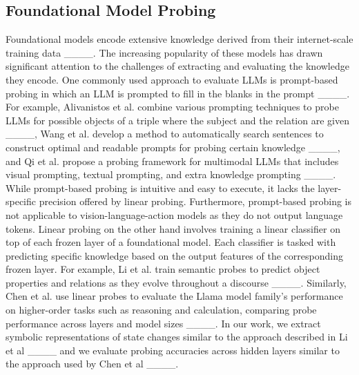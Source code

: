\subsection{Foundational Model Probing}
Foundational models encode extensive knowledge derived from their internet-scale training data ____. The increasing popularity of these models has drawn significant attention to the challenges of extracting and evaluating the knowledge they encode. One commonly used approach to evaluate LLMs is prompt-based probing in which an LLM is prompted to fill in the blanks in the prompt ____. For example, Alivanistos et al. combine various prompting techniques to probe LLMs for possible objects of a triple where the subject and the relation are given ____, Wang et al. develop a method to automatically search sentences to construct optimal and readable prompts for probing certain knowledge ____, and Qi et al. propose a probing framework for multimodal LLMs that includes visual prompting, textual prompting, and extra knowledge prompting ____. While prompt-based probing is intuitive and easy to execute, it lacks the layer-specific precision offered by linear probing. Furthermore, prompt-based probing is not applicable to vision-language-action models as they do not output language tokens. Linear probing on the other hand involves training a linear classifier on top of each frozen layer of a foundational model. Each classifier is tasked with predicting specific knowledge based on the output features of the corresponding frozen layer. For example, Li et al. train semantic probes to predict object properties and relations as they evolve throughout a discourse ____. Similarly, Chen et al. use linear probes to evaluate the Llama model family’s performance on higher-order tasks such as reasoning and calculation, comparing probe performance across layers and model sizes ____. In our work, we extract symbolic representations of state changes similar to the approach described in Li et al ____ and we evaluate probing accuracies across hidden layers similar to the approach used by Chen et al ____.